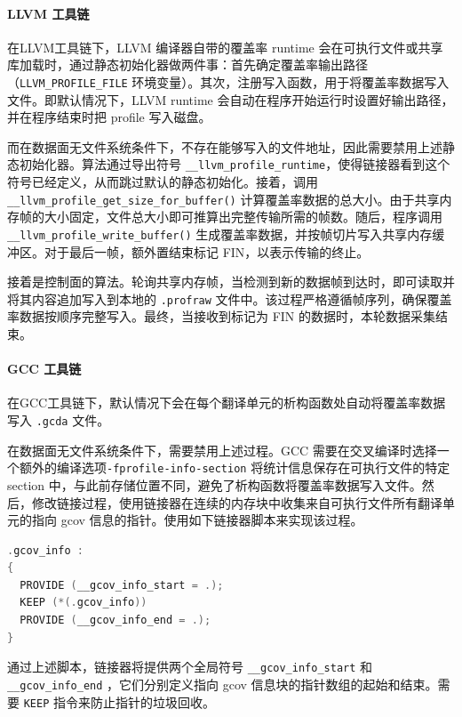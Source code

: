 \paragraph{LLVM 工具链}
在LLVM工具链下，LLVM 编译器自带的覆盖率 runtime 会在可执行文件或共享库加载时，通过静态初始化器做两件事：首先确定覆盖率输出路径（\verb|LLVM_PROFILE_FILE| 环境变量）。其次，注册写入函数，用于将覆盖率数据写入文件。即默认情况下，LLVM runtime 会自动在程序开始运行时设置好输出路径，并在程序结束时把 profile 写入磁盘。

而在数据面无文件系统条件下，不存在能够写入的文件地址，因此需要禁用上述静态初始化器。算法通过导出符号 \verb|__llvm_profile_runtime|，使得链接器看到这个符号已经定义，从而跳过默认的静态初始化。接着，调用 \verb|__llvm_profile_get_size_for_buffer()| 计算覆盖率数据的总大小。由于共享内存帧的大小固定，文件总大小即可推算出完整传输所需的帧数。随后，程序调用 \verb|__llvm_profile_write_buffer()| 生成覆盖率数据，并按帧切片写入共享内存缓冲区。对于最后一帧，额外置结束标记 FIN，以表示传输的终止。

接着是控制面的算法。轮询共享内存帧，当检测到新的数据帧到达时，即可读取并将其内容追加写入到本地的 \verb|.profraw| 文件中。该过程严格遵循帧序列，确保覆盖率数据按顺序完整写入。最终，当接收到标记为 FIN 的数据时，本轮数据采集结束。

\paragraph{GCC 工具链}
在GCC工具链下，默认情况下会在每个翻译单元的析构函数处自动将覆盖率数据写入 \verb|.gcda| 文件。

在数据面无文件系统条件下，需要禁用上述过程。GCC 需要在交叉编译时选择一个额外的编译选项\verb|-fprofile-info-section| 将统计信息保存在可执行文件的特定 section 中，与此前存储位置不同，避免了析构函数将覆盖率数据写入文件。然后，修改链接过程，使用链接器在连续的内存块中收集来自可执行文件所有翻译单元的指向 gcov 信息的指针。使用如下链接器脚本来实现该过程。

\begin{lstlisting}[language=c, basicstyle=\ttfamily\small, breaklines=true, breakindent=2em, frame=tb]
.gcov_info :
{
  PROVIDE (__gcov_info_start = .);
  KEEP (*(.gcov_info))
  PROVIDE (__gcov_info_end = .);
}
\end{lstlisting}

通过上述脚本，链接器将提供两个全局符号 \verb|__gcov_info_start| 和 \verb|__gcov_info_end| ，它们分别定义指向 gcov 信息块的指针数组的起始和结束。需要 \verb|KEEP| 指令来防止指针的垃圾回收。

